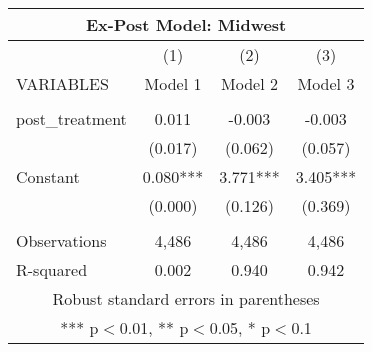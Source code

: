 \begin{tabular}{lccc}
\multicolumn{4}{c}{Ex-Post Model: Midwest} \\ \hline
 & (1) & (2) & (3) \\
VARIABLES & Model 1 & Model 2 & Model 3 \\ \hline
 &  &  &  \\
post\_treatment & 0.011 & -0.003 & -0.003 \\
 & (0.017) & (0.062) & (0.057) \\
Constant & 0.080*** & 3.771*** & 3.405*** \\
 & (0.000) & (0.126) & (0.369) \\
 &  &  &  \\
Observations & 4,486 & 4,486 & 4,486 \\
 R-squared & 0.002 & 0.940 & 0.942 \\ \hline
\multicolumn{4}{c}{ Robust standard errors in parentheses} \\
\multicolumn{4}{c}{ *** p$<$0.01, ** p$<$0.05, * p$<$0.1} \\
\end{tabular}

